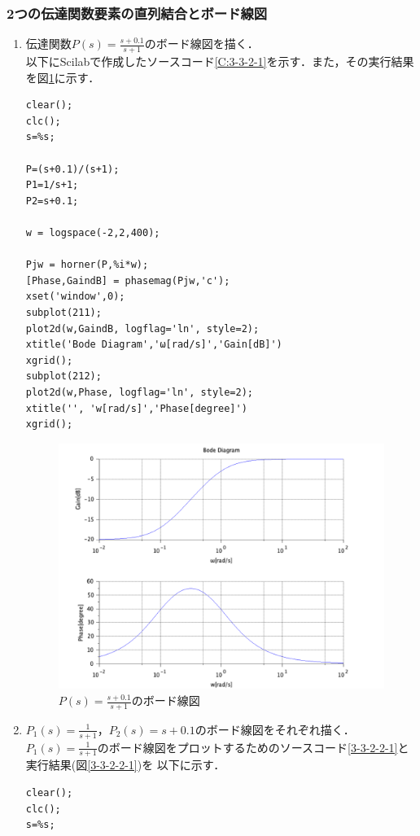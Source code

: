 \documentclass[a4paper,11pt]{jsarticle}
\begin{document}
\subsubsection{2つの伝達関数要素の直列結合とボード線図}
\begin{enumerate}
  \item 伝達関数$P(s)=\frac{s+0.1}{s+1}$のボード線図を描く．\\
        以下にScilabで作成したソースコード\ref{C:3-3-2-1}を示す．また，その実行結果を図\ref{3-3-2-1}に示す．
        \begin{lstlisting}[caption=図\ref{3-3-2-1}をプロットするコード, label=C:3-3-2-1]
clear();
clc();
s=%s;

P=(s+0.1)/(s+1);
P1=1/s+1;
P2=s+0.1;

w = logspace(-2,2,400);

Pjw = horner(P,%i*w);
[Phase,GaindB] = phasemag(Pjw,'c');
xset('window',0);
subplot(211);
plot2d(w,GaindB, logflag='ln', style=2);
xtitle('Bode Diagram','ω[rad/s]','Gain[dB]')
xgrid();
subplot(212);
plot2d(w,Phase, logflag='ln', style=2);
xtitle('', 'w[rad/s]','Phase[degree]')
xgrid();
      \end{lstlisting}
        \begin{figure}[H]
          \centering
          \includegraphics[width=0.8\linewidth]{picture/kadai7-1.png}
          \caption{$P(s)=\frac{s+0.1}{s+1}$のボード線図}
          \label{3-3-2-1}
        \end{figure}

  \item $P_1(s)=\frac{1}{s+1}$，$P_2(s)=s+0.1$のボード線図をそれぞれ描く．\\
        $P_1(s)=\frac{1}{s+1}$のボード線図をプロットするためのソースコード\ref{3-3-2-2-1}と実行結果(図\ref{3-3-2-2-1})を
        以下に示す．
        \begin{lstlisting}[caption=図\ref{3-3-2-2-1}をプロットするコード, label=C:3-3-2-2-1]
clear();
clc();
s=%s;


\end{lstlisting}
\end{enumerate}
\end{document}
